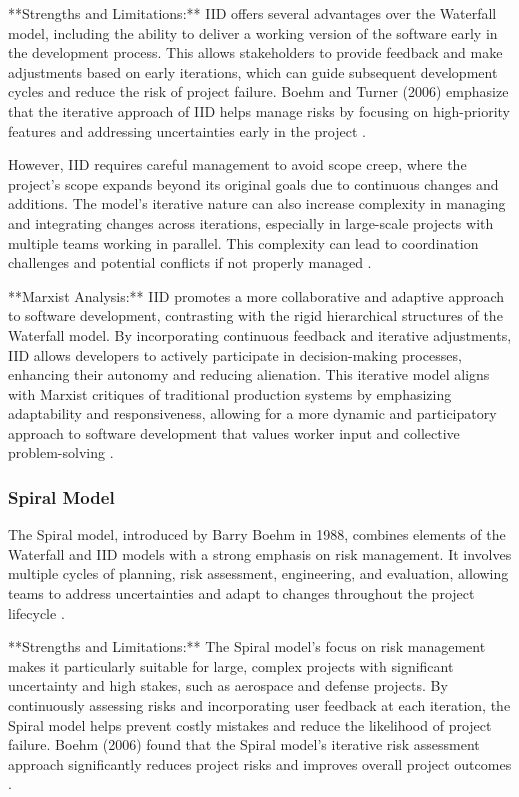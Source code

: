 \begin{refsection}
**Strengths and Limitations:** IID offers several advantages over the Waterfall model, including the ability to deliver a working version of the software early in the development process. This allows stakeholders to provide feedback and make adjustments based on early iterations, which can guide subsequent development cycles and reduce the risk of project failure. Boehm and Turner (2006) emphasize that the iterative approach of IID helps manage risks by focusing on high-priority features and addressing uncertainties early in the project \cite[pp.~73-94]{boehm2006spiral}.

However, IID requires careful management to avoid scope creep, where the project's scope expands beyond its original goals due to continuous changes and additions. The model's iterative nature can also increase complexity in managing and integrating changes across iterations, especially in large-scale projects with multiple teams working in parallel. This complexity can lead to coordination challenges and potential conflicts if not properly managed \cite[pp.~116-140]{sommerville2016software}.

**Marxist Analysis:** IID promotes a more collaborative and adaptive approach to software development, contrasting with the rigid hierarchical structures of the Waterfall model. By incorporating continuous feedback and iterative adjustments, IID allows developers to actively participate in decision-making processes, enhancing their autonomy and reducing alienation. This iterative model aligns with Marxist critiques of traditional production systems by emphasizing adaptability and responsiveness, allowing for a more dynamic and participatory approach to software development that values worker input and collective problem-solving \cite[pp.~18-40]{braverman1998labor}.

\subsubsection{Spiral Model}

The Spiral model, introduced by Barry Boehm in 1988, combines elements of the Waterfall and IID models with a strong emphasis on risk management. It involves multiple cycles of planning, risk assessment, engineering, and evaluation, allowing teams to address uncertainties and adapt to changes throughout the project lifecycle \cite[pp.~61-72]{boehm1988spiral}.

**Strengths and Limitations:** The Spiral model’s focus on risk management makes it particularly suitable for large, complex projects with significant uncertainty and high stakes, such as aerospace and defense projects. By continuously assessing risks and incorporating user feedback at each iteration, the Spiral model helps prevent costly mistakes and reduce the likelihood of project failure. Boehm (2006) found that the Spiral model's iterative risk assessment approach significantly reduces project risks and improves overall project outcomes \cite[pp.~45-68]{boehm2006spiral}.


\end{refsection}

